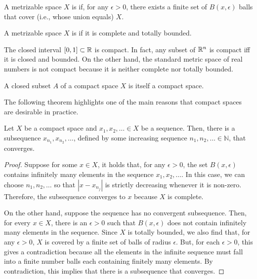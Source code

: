 \begin{definition}
A metrizable space $X$ is  if, for any $\epsilon > 0$, there exists a finite set of $B(x,\epsilon)$ balls that cover (i.e., whose union equals) $X$.
\end{definition}

\begin{definition}
A metrizable space $X$ is  if it is complete and totally bounded.
\end{definition}

The closed interval $[0,1]\subset \mathbb{R}$ is compact.
In fact, any subset of $\mathbb{R}^n$ is compact iff it is closed and bounded.
On the other hand, the standard metric space of real numbers is not compact because it is neither complete nor totally bounded.

\begin{theorem}
\label{thm:CompactClosedSubsetCompact}
A closed subset $A$ of a compact space $X$ is itself a compact space.
\end{theorem}

The following theorem highlights one of the main reasons that compact spaces are desirable in practice.

\begin{theorem}
Let $X$ be a compact space and $x_1,x_2,\ldots \in X$ be a sequence.
Then, there is a subsequence $x_{n_1},x_{n_2},\ldots$, defined by some increasing sequence $n_1,n_2,\ldots \in \mathbb{N}$, that converges.
\end{theorem}
\begin{proof}
Suppose for some $x\in X$, it holds that, for any $\epsilon > 0$, the set $B(x,\epsilon)$ contains infinitely many elements in the sequence $x_1,x_2,\ldots$.
In this case, we can choose $n_1,n_2,\ldots$ so that $|x - x_{n_j}|$ is strictly decreasing whenever it is non-zero.
Therefore, the subsequence converges to $x$ because $X$ is complete.

On the other hand, suppose the sequence has no convergent subsequence.
Then, for every $x\in X$, there is an $\epsilon >0$ such that $B(x,\epsilon)$ does not contain infinitely many elements in the sequence.
Since $X$ is totally bounded, we also find that, for any $\epsilon >0$, $X$ is covered by a finite set of balls of radius $\epsilon$.
But, for each $\epsilon >0$, this gives a contradiction because all the elements in the infinite sequence must fall into a finite number balls each containing finitely many elements.
By contradiction, this implies that there is a subsequence that converges.
\end{proof}

